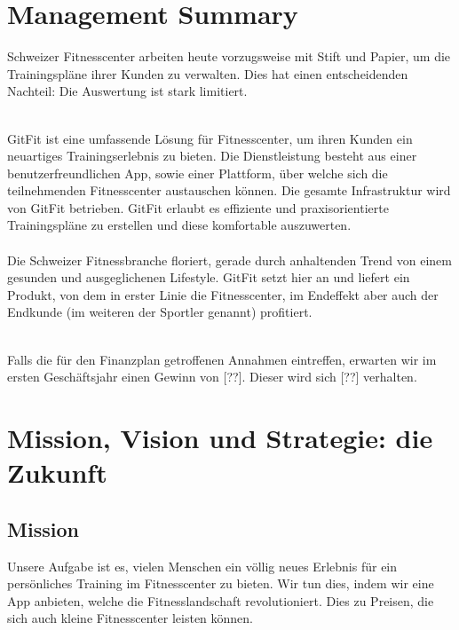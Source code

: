 

\newcommand{\SUBJECT}{Businessplan}
\newcommand{\TITLE}{GitFit}







\section{Management Summary}
\setcounter{page}{1}
Schweizer Fitnesscenter arbeiten heute vorzugsweise mit Stift und Papier, um die Trainingspläne ihrer Kunden zu verwalten. Dies hat einen entscheidenden Nachteil: Die Auswertung ist stark limitiert.

\hfill \\
GitFit ist eine umfassende Lösung für Fitnesscenter, um ihren Kunden ein neuartiges Trainingserlebnis zu bieten. Die Dienstleistung besteht aus einer benutzerfreundlichen App, sowie einer Plattform, über welche sich die teilnehmenden Fitnesscenter austauschen können. Die gesamte Infrastruktur wird von GitFit betrieben. GitFit erlaubt es effiziente und praxisorientierte Trainingspläne zu erstellen und diese komfortable auszuwerten.  
\hfill \\ \\
Die Schweizer Fitnessbranche floriert, gerade durch anhaltenden Trend von einem gesunden und ausgeglichenen Lifestyle. GitFit setzt hier an und liefert ein Produkt, von dem in erster Linie die Fitnesscenter, im Endeffekt aber auch der Endkunde (im weiteren der Sportler genannt) profitiert.  

\hfill \\
Falls die für den Finanzplan getroffenen Annahmen eintreffen, erwarten wir im ersten Geschäftsjahr einen Gewinn von [??]. Dieser wird sich [??] verhalten.




\clearpage
\section{Mission, Vision und Strategie: die Zukunft}
\subsection{Mission}
Unsere Aufgabe ist es, vielen Menschen ein völlig neues Erlebnis für ein persönliches Training im Fitnesscenter zu bieten. Wir tun dies, indem wir eine App anbieten, welche die Fitnesslandschaft revolutioniert. Dies zu Preisen, die sich auch kleine Fitnesscenter leisten können.

